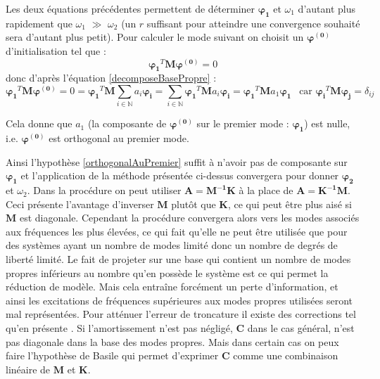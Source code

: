 \documentclass[12pt,a4paper]{report}
\begin{document}
Les deux équations précédentes permettent de déterminer $\boldsymbol{\varphi_1}$ et $\omega_1$ d'autant plus rapidement que $\omega_1$ $\gg$ $\omega_2$ (un $r$ suffisant pour atteindre une convergence souhaité sera d'autant plus petit). Pour calculer le mode suivant on choisit un $\boldsymbol{\varphi^{(0)}}$ d'initialisation tel que :
\begin{equation}
\label{orthogonalAuPremier}
\boldsymbol{\varphi_1}^T \mathbf{M} \boldsymbol{\varphi^{(0)}}  = 0
\end{equation}
donc d'après l'équation \ref{decomposeBasePropre} :
\begin{equation}
\boldsymbol{\varphi_1}^T \mathbf{M} \boldsymbol{\varphi^{(0)}}  
= 0
= \boldsymbol{\varphi_1}^T \mathbf{M} 
	\sum_{i \in \mathbb{N}} a_i \boldsymbol{\varphi_i}
= \sum_{i \in \mathbb{N}} \boldsymbol{\varphi_1}^T \mathbf{M} 
	a_i \boldsymbol{\varphi_i}
= \boldsymbol{\varphi_1}^T \mathbf{M} 
	a_1 \boldsymbol{\varphi_1}
~~\text{ car } 
\boldsymbol{\varphi_i}^T \mathbf{M} \boldsymbol{\varphi_j}
= \delta_{ij}
\end{equation}

Cela donne que $a_1$ (la composante de $\boldsymbol{\varphi^{(0)}}$ sur le premier mode : $\boldsymbol{\varphi_1}$) est nulle, i.e. $\boldsymbol{\varphi^{(0)}}$ est orthogonal au premier mode.

Ainsi l'hypothèse \ref{orthogonalAuPremier} suffit à n'avoir pas de composante sur $\boldsymbol{\varphi_1}$ et l'application de la méthode présentée ci-dessus convergera pour donner $\boldsymbol{\varphi_2}$ et $\omega_2$. Dans la procédure on peut utiliser $\mathbf{A} = \mathbf{M^{-1}} \mathbf{K}$ à la place de $\mathbf{A} = \mathbf{K^{-1}} \mathbf{M}$. Ceci présente l'avantage d'inverser $\mathbf{M}$ plutôt que $\mathbf{K}$, ce qui peut être plus aisé si $\mathbf{M}$ est diagonale. Cependant la procédure convergera alors vers les modes associés aux fréquences les plus
élevées, ce qui fait qu'elle ne peut être utilisée que pour des systèmes ayant un nombre de modes limité donc un nombre de degrés de liberté limité.
Le fait de projeter sur une base qui contient un nombre de modes propres inférieurs au nombre qu'en possède le système est ce qui permet la réduction de modèle. Mais cela entraîne forcément un perte d'information, et ainsi les excitations de fréquences supérieures aux modes propres utilisées seront mal représentées. Pour atténuer l'erreur de troncature il existe des corrections tel qu'en présente \cite{Aster}. Si l'amortissement n'est pas négligé, $\mathbf{C}$ dans le cas général, n'est pas diagonale dans la base des modes propres. Mais dans certain cas on peux faire l'hypothèse de Basile qui permet d'exprimer $\mathbf{C}$ comme une combinaison linéaire de $\mathbf{M}$ et $\mathbf{K}$.
\end{document}
